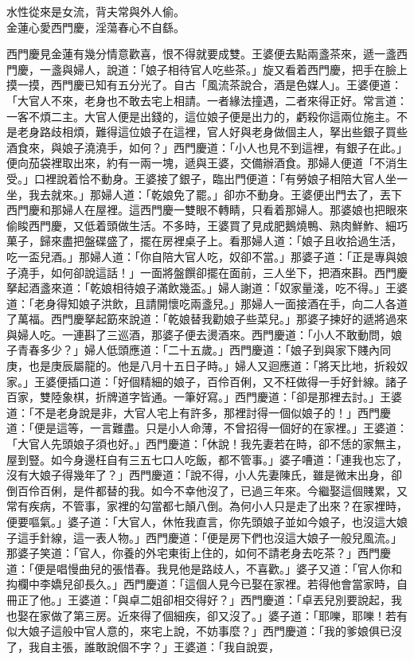 \begin{myquote} 
水性從來是女流，背夫常與外人偷。\\金蓮心愛西門慶，淫蕩春心不自繇。
\end{myquote} 

西門慶見金蓮有幾分情意歡喜，恨不得就要成雙。王婆便去點兩盞茶來，遞一盞西門慶，一盞與婦人，說道：「娘子相待官人吃些茶。」旋又看着西門慶，把手在臉上摸一摸，西門慶已知有五分光了。自古「風流茶說合，酒是色媒人」。王婆便道：「大官人不來，老身也不敢去宅上相請。一者緣法撞遇，二者來得正好。常言道：一客不煩二主。大官人便是出錢的，這位娘子便是出力的，虧殺你這兩位施主。不是老身路歧相煩，難得這位娘子在這裡，官人好與老身做個主人，拏出些銀子買些酒食來，與娘子澆澆手，如何？」西門慶道：「小人也見不到這裡，有銀子在此。」便向茄袋裡取出來，約有一兩一塊，遞與王婆，交備辦酒食。那婦人便道「不消生受。」口裡說着恰不動身。王婆接了銀子，臨出門便道：「有勞娘子相陪大官人坐一坐，我去就來。」那婦人道：「乾娘免了罷。」卻亦不動身。{}王婆便出門去了，丟下西門慶和那婦人在屋裡。這西門慶一雙眼不轉睛，只看着那婦人。那婆娘也把眼來偷睃西門慶，又低着頭做生活。不多時，王婆買了見成肥鵝燒鴨、熟肉鮮鮓、細巧菓子，歸來盡把盤碟盛了，擺在房裡桌子上。看那婦人道：「娘子且收拾過生活，吃一盃兒酒。」那婦人道：「你自陪大官人吃，奴卻不當。」那婆子道：「正是專與娘子澆手，如何卻說這話！」一面將盤饌卻擺在面前，三人坐下，把酒來斟。西門慶拏起酒盞來道：「乾娘相待娘子滿飲幾盃。」婦人謝道：「奴家量淺，吃不得。」王婆道：「老身得知娘子洪飲，且請開懷吃兩盞兒。」那婦人一面接酒在手，向二人各道了萬福。西門慶拏起筯來說道：「乾娘替我勸娘子些菜兒。」那婆子揀好的遞將過來與婦人吃。一連斟了三巡酒，那婆子便去燙酒來。西門慶道：「小人不敢動問，娘子青春多少？」婦人低頭應道：「二十五歲。」西門慶道：「娘子到與家下賤內同庚，也是庚辰屬龍的。他是八月十五日子時。」婦人又迴應道：「將天比地，折殺奴家。」王婆便插口道：「好個精細的娘子，百伶百俐，又不枉做得一手好針線。諸子百家，雙陸象棋，折牌道字皆通。一筆好寫。」西門慶道：「卻是那裡去討。」王婆道：「不是老身說是非，大官人宅上有許多，那裡討得一個似娘子的！」西門慶道：「便是這等，一言難盡。只是小人命薄，不曾招得一個好的在家裡。」王婆道：「大官人先頭娘子須也好。」西門慶道：「休說！我先妻若在時，卻不恁的家無主，屋到豎。如今身邊枉自有三五七口人吃飯，都不管事。」婆子嘈道：「連我也忘了，沒有大娘子得幾年了？」西門慶道：「說不得，小人先妻陳氏，雖是微末出身，卻倒百伶百俐，{}是件都替的我。如今不幸他沒了，已過三年來。今繼娶這個賤累，又常有疾病，不管事，家裡的勾當都七顛八倒。為何小人只是走了出來？在家裡時，便要嘔氣。」婆子道：「大官人，休恠我直言，你先頭娘子並如今娘子，也沒這大娘子這手針線，這一表人物。」西門慶道：「便是房下們也沒這大娘子一般兒風流。」{}{}那婆子笑道：「官人，你養的外宅東街上住的，如何不請老身去吃茶？」西門慶道：「便是唱慢曲兒的張惜春。我見他是路歧人，不喜歡。」婆子又道：「官人你和抅欄中李嬌兒卻長久。」西門慶道：「這個人見今已娶在家裡。若得他會當家時，自冊正了他。」王婆道：「與卓二姐卻相交得好？」西門慶道：「卓丟兒別要說起，我也娶在家做了第三房。近來得了個細疾，卻又沒了。」婆子道：「耶嚛，耶嚛！若有似大娘子這般中官人意的，來宅上說，不妨事麼？」西門慶道：「我的爹娘俱已沒了，我自主張，誰敢說個不字？」王婆道：「我自說耍，